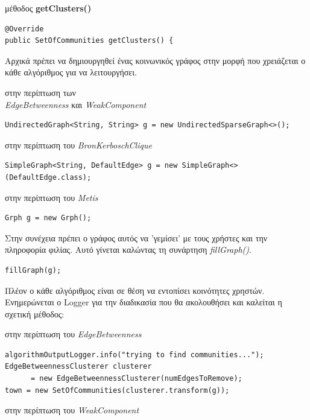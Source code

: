 \begin{description}
  
  
\item μέθοδος \textbf{getClusters()}\hfill \\
\begin{lstlisting}[frame=single]
@Override
public SetOfCommunities getClusters() {
\end{lstlisting}
Αρχικά πρέπει να δημιουργηθεί ένας κοινωνικός γράφος στην μορφή που χρειάζεται ο κάθε αλγόριθμος για να λειτουργήσει. 
  \begin{description}
    \item στην περίπτωση των\\ \emph{EdgeBetweenness} και \emph{WeakComponent}
\begin{lstlisting}[frame=single]
  UndirectedGraph<String, String> g = new UndirectedSparseGraph<>();
\end{lstlisting} 
  \item στην περίπτωση του \emph{BronKerboschClique}
\begin{lstlisting}[frame=single]
  SimpleGraph<String, DefaultEdge> g = new SimpleGraph<>(DefaultEdge.class);
\end{lstlisting} 
  \item στην περίπτωση του \emph{Metis}
\begin{lstlisting}[frame=single]
  Grph g = new Grph();
\end{lstlisting} 
  \end{description}  
Στην συνέχεια πρέπει ο γράφος αυτός να 'γεμίσει' με τους χρήστες και την πληροφορία φιλίας. Αυτό γίνεται καλώντας τη συνάρτηση \emph{fillGraph()}.
\begin{lstlisting}[frame=single]
  fillGraph(g);
\end{lstlisting} 
Πλέον ο κάθε αλγόριθμος είναι σε θέση να εντοπίσει κοινότητες χρηστών. Ενημερώνεται ο Logger για την διαδικασία που θα ακολουθήσει και καλείται η
σχετική μέθοδος: 
  \begin{description}
    \item στην περίπτωση του \emph{EdgeBetweenness}
\begin{lstlisting}[frame=single]
algorithmOutputLogger.info("trying to find communities...");        
EdgeBetweennessClusterer clusterer 
	  = new EdgeBetweennessClusterer(numEdgesToRemove);        
town = new SetOfCommunities(clusterer.transform(g));
\end{lstlisting}   
  \item στην περίπτωση του \emph{WeakComponent}
\begin{lstlisting}[frame=single]

\end{lstlisting}
\end{description}
\end{description}
